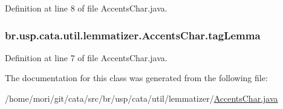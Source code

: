 Definition at line 8 of file Accents\+Char.\+java.

\hypertarget{classbr_1_1usp_1_1cata_1_1util_1_1lemmatizer_1_1_accents_char_a0cb3f3f9b47f36a8786117764e48281f}{
\subsubsection[{tag\+Lemma}]{ br.\+usp.\+cata.\+util.\+lemmatizer.\+Accents\+Char.\+tag\+Lemma\hspace{0.3cm}{\ttfamily [private]}}}\label{classbr_1_1usp_1_1cata_1_1util_1_1lemmatizer_1_1_accents_char_a0cb3f3f9b47f36a8786117764e48281f}


Definition at line 7 of file Accents\+Char.\+java.



The documentation for this class was generated from the following file\+:\begin{DoxyCompactItemize}
\item 
/home/mori/git/cata/src/br/usp/cata/util/lemmatizer/\hyperlink{_accents_char_8java}{Accents\+Char.\+java}\end{DoxyCompactItemize}
